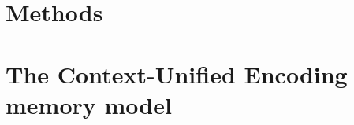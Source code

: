\documentclass[
    paper=letter,
    12pt,
    titlepage,
    twoside,
    final,
    BCOR=10mm,
    DIV=9,
    listof=totoc]{scrbook}
\begin{document}
 

\part{Methods}





\part{The Context-Unified Encoding memory model}\label{prt:cue}









\printbibliography[heading=bibintoc,title=References]

\appendix
{}




\end{document}
